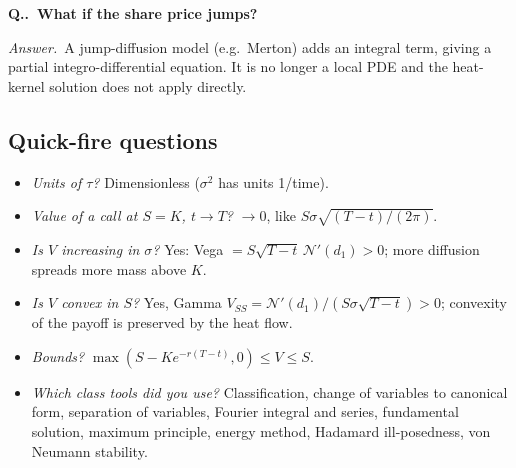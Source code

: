 \documentclass[11pt]{article}
\newcommand{\N}{\mathcal N}
\newcounter{qn}[section]
\renewcommand{\theqn}{\thesection.\arabic{qn}}
\newcommand{\Q}[1]{\par\medskip\refstepcounter{qn}\noindent\textbf{Q\theqn.\ #1}\par\nopagebreak\smallskip}
\newcommand{\A}{\noindent\textit{Answer.}\ }
\theoremstyle{definition}
\begin{document}
\Q{What if the share price jumps?}
\A A jump-diffusion model (e.g.\ Merton) adds an integral term, giving a partial integro-differential equation.
It is no longer a local PDE and the heat-kernel solution does not apply directly.

\subsection{Quick-fire questions}
\begin{itemize}
  \item \emph{Units of $\tau$?} Dimensionless ($\sigma^2$ has units 1/time).
  \item \emph{Value of a call at $S=K$, $t\to T$?} $\to0$, like $S\sigma\sqrt{(T-t)/(2\pi)}$.
  \item \emph{Is $V$ increasing in $\sigma$?} Yes: Vega $=S\sqrt{T-t}\,\N'(d_1)>0$; more diffusion spreads more
    mass above $K$.
  \item \emph{Is $V$ convex in $S$?} Yes, Gamma $V_{SS}=\N'(d_1)/(S\sigma\sqrt{T-t})>0$; convexity of the payoff
    is preserved by the heat flow.
  \item \emph{Bounds?} $\max(S-Ke^{-r(T-t)},0)\le V\le S$.
  \item \emph{Which class tools did you use?} Classification, change of variables to canonical form, separation
    of variables, Fourier integral and series, fundamental solution, maximum principle, energy method,
    Hadamard ill-posedness, von Neumann stability.
\end{itemize}
\end{document}
